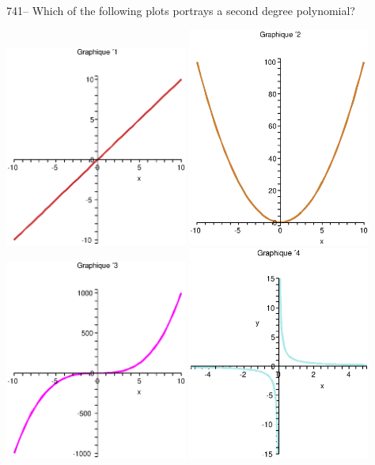 \documentclass[letterpaper, 12pt]{article}
\begin{document}
741-- Which of the following plots portrays a second degree polynomial?\\
    \begin{center}
    \includegraphics[width=6cm, bb=0 0 400 400]{fonction3.eps}
\includegraphics[width=6cm, bb=0 0 400 400]{fonction4.eps}
\includegraphics[width=6cm, bb=0 0 400 400]{fonction5.eps}
\includegraphics[width=6cm, bb=0 0 400 400]{fonction7.eps}

\end{center}
\end{document}
